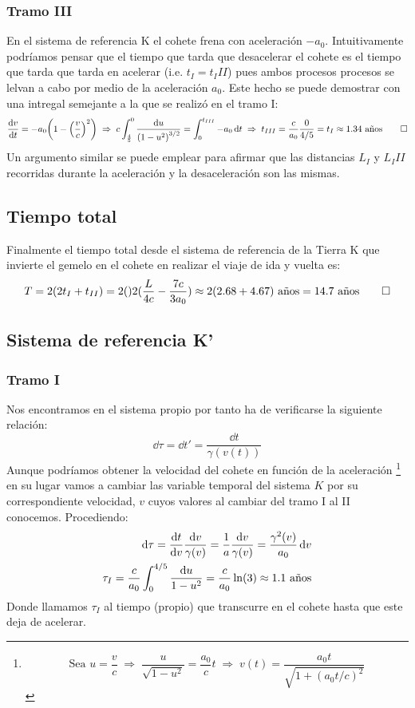 \documentclass[11pt]{article}
\begin{document}
\subsubsection*{Tramo III} 
En el sistema de referencia K el cohete frena con aceleración $-a_0$. Intuitivamente podríamos pensar que el tiempo que tarda que desacelerar el cohete es el tiempo que tarda que tarda en acelerar (i.e. $t_I = t_III$) pues ambos procesos procesos se lelvan a cabo por medio de la aceleración $a_0$. Este hecho se puede demostrar con una intregal semejante a la que se realizó en el tramo I:
\begin{align*}
    \dv{v}{t} = -a_0 \qty(1 - \qty(\dfrac{v}{c})^2) \;\Rightarrow\; c\int_{\frac{4}{5}}^{0} \dfrac{\dd{u}}{\qty(1-u^2)^{3/2}} = \int_{0}^{t_{III}} -a_0 \dd{t} \;\Rightarrow\; t_{III} = \dfrac{c}{a_0}\dfrac{0}{4/5} = t_{I} \approx 1.34 \textrm{ años} \qed 
\end{align*}
Un argumento similar se puede emplear para afirmar que las distancias $L_I$ y $L_III$ recorridas durante la aceleración y la desaceleración son las mismas.
\subsection*{Tiempo total}
Finalmente el tiempo total desde el sistema de referencia de la Tierra K que invierte el gemelo en el cohete en realizar el viaje de ida y vuelta es: 
\begin{equation}
    T = 2(2t_I + t_{II}) = 2\qty 2(\dfrac{L}{4c}-\dfrac{7c}{3a_0}) \approx 2(2.68 + 4.67) \textrm{ años} = 14.7 \textrm{ años} \qed
\end{equation}
\subsection*{Sistema de referencia K'}
\subsubsection*{Tramo I}
Nos encontramos en el sistema propio por tanto ha de verificarse la siguiente relación: 
\begin{equation}
    \label{Tiempo propio}
    \dd{\tau} = \dd{t'} = \dfrac{\dd{t}}{\gamma(v(t))}
\end{equation}
Aunque podríamos obtener la velocidad del cohete en función de la aceleración \footnote{
    \begin{equation*}
        \textrm{Sea } u = \dfrac{v}{c} \;\Rightarrow\; \dfrac{u}{\sqrt{1-u^2}} = \dfrac{a_0}{c} t \;\Rightarrow\; v(t) = \dfrac{a_0 t}{\sqrt{1 + (a_0 t/c)^2}} 
    \end{equation*}
} en su lugar vamos a cambiar las variable temporal del sistema $K$ por su correspondiente velocidad, $v$ cuyos valores al cambiar del tramo I al II conocemos. Procediendo: 
\begin{align}
    \dd{\tau} = \dv{t}{v} \dfrac{\dd{v}}{\gamma(v)} = \dfrac{1}{a} \dfrac{\dd{v}}{\gamma(v)} = \dfrac{\gamma^2(v)}{a_0}\dd{v}\\
    \tau_I =  \dfrac{c}{a_0}\int_{0}^{4/5} \dfrac{\dd{u}}{1-u^2} = \dfrac{c }{a_0} \ln(3) \approx 1.1 \textrm{ años} 
\end{align} 
Donde llamamos $\tau_I$ al tiempo (propio) que transcurre en el cohete hasta que este deja de acelerar.
\end{document}
